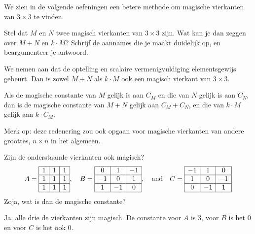 \documentclass{ximera}
\begin{document}
\begin{exercise}
\begin{oplossing}
        We zien in de volgende oefeningen een betere methode om magische vierkanten van \(3 \times 3\) te vinden.        
    \end{oplossing}
\end{exercise}

\begin{exercise}
    Stel dat \(M\) en \(N\) twee magisch vierkanten van \(3\times 3\) zijn.
    Wat kan je dan zeggen over \(M + N\) en \(k \cdot M\)?
    Schrijf de aannames die je maakt duidelijk op, en beargumenteer je antwoord.
    \begin{oplossing}
        We nemen aan dat de optelling en scalaire vermenigvuldiging elementsgewijs gebeurt.
        Dan is zowel \(M + N\) als \(k \cdot M\) ook een magisch vierkant van \(3 \times 3\).

        Als de magische constante van \(M\) gelijk is aan \(C_M\) en die van \(N\) gelijk is aan \(C_N\), dan is de magische constante van \(M + N\) gelijk aan \(C_M + C_N\), en die van \(k \cdot M\) gelijk aan \(k \cdot C_M\).

        Merk op: deze redenering zou ook opgaan voor magische vierkanten van andere groottes, \(n \times n \) in het algemeen.
    \end{oplossing}
\end{exercise}

\begin{exercise}
    Zijn de onderstaande vierkanten ook magisch?
    \[
    A=
    \begin{array}{|c|c|c|}
    \hline
    1 & 1 & 1 \\
    \hline
    1 & 1 & 1 \\
    \hline
    1 & 1 & 1 \\
    \hline
    \end{array}
    , \quad
    B=
    \begin{array}{|c|c|c|}
    \hline
    0 & 1 & -1 \\
    \hline
    -1 & 0 & 1 \\
    \hline
    1 & -1 & 0 \\
    \hline
    \end{array}
    , \quad \text{and} \quad
    C=
    \begin{array}{|c|c|c|}
    \hline
    -1 & 1 & 0 \\
    \hline
    1 & 0 & -1 \\
    \hline
    0 & -1 & 1 \\
    \hline
    \end{array}
    \]
    Zoja, wat is dan de magische constante?
    \begin{oplossing}
        Ja, alle drie de vierkanten zijn magisch.
        De constante voor \(A\) is \(3\), voor \(B\) is het \(0\) en voor \(C\) is het ook \(0\).
    \end{oplossing}
\end{exercise}
\end{document}
